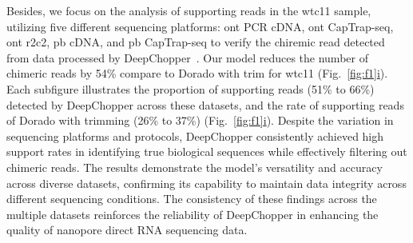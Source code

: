 \documentclass[pdflatex, sn-mathphys-num, lineno]{sn-jnl}%
\newcommand{\figref}[2]{Fig.~\hyperref[#1]{\ref*{#1}#2}}
\theoremstyle{thmstyleone}%
\theoremstyle{thmstyletwo}%
\theoremstyle{thmstylethree}%
\begin{document}
Besides, we focus on the analysis of supporting reads in the wtc11 sample, utilizing five different sequencing platforms: \gls{ont} PCR cDNA, \gls{ont} CapTrap-seq, \gls{ont} \gls{r2c2}, \gls{pb} cDNA, and \gls{pb} CapTrap-seq to verify the chiremic read detected from data processed by DeepChopper~\cite{carbonell2024captrap}.
Our model reduces the number of chimeric reads by 54\% compare to Dorado with trim for wtc11  (\figref{fig:f1}{i}).
Each subfigure illustrates the proportion of supporting reads (51\% to 66\%) detected by DeepChopper across these datasets, and the rate of supporting reads of Dorado with trimming (26\% to 37\%)  (\figref{fig:f1}{i}).
Despite the variation in sequencing platforms and protocols, DeepChopper consistently achieved high support rates in identifying true biological sequences while effectively filtering out chimeric reads.
The results demonstrate the model's versatility and accuracy across diverse datasets, confirming its capability to maintain data integrity across different sequencing conditions.
The consistency of these findings across the multiple datasets reinforces the reliability of DeepChopper in enhancing the quality of nanopore direct RNA sequencing data.
\end{document}
